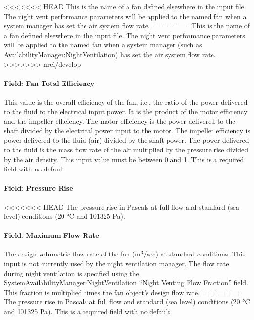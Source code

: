 <<<<<<< HEAD
This is the name of a fan defined elsewhere in the input file. The night vent performance parameters will be applied to the named fan when a system manager has set the air system flow rate.
=======
This is the name of a fan defined elsewhere in the input file. The night vent performance parameters will be applied to the named fan when a system manager (such as \hyperref[availabilitymanagernightventilation]{AvailabilityManager:NightVentilation}) has set the air system flow rate.
>>>>>>> nrel/develop

\paragraph{Field: Fan Total Efficiency}\label{field-fan-total-efficiency-4}

This value is the overall efficiency of the fan, i.e., the ratio of the power delivered to the fluid to the electrical input power. It is the product of the motor efficiency and the impeller efficiency. The motor efficiency is the power delivered to the shaft divided by the electrical power input to the motor. The impeller efficiency is power delivered to the fluid (air) divided by the shaft power. The power delivered to the fluid is the mass flow rate of the air multiplied by the pressure rise divided by the air density. This input value must be between 0 and 1. This is a required field with no default.

\paragraph{Field: Pressure Rise}\label{field-pressure-rise-4}

<<<<<<< HEAD
The pressure rise in Pascals at full flow and standard (sea level) conditions (20 °C and 101325 Pa).

\paragraph{Field: Maximum Flow Rate}\label{field-maximum-flow-rate-4}

The design volumetric flow rate of the fan (m\(^{3}\)/sec) at standard conditions. This input is not currently used by the night ventilation manager. The flow rate during night ventilation is specified using the System\hyperref[availabilitymanagernightventilation]{AvailabilityManager:NightVentilation} ``Night Venting Flow Fraction'' field. This fraction is multiplied times the fan object's design flow rate.
=======
The pressure rise in Pascals at full flow and standard (sea level) conditions (20 °C and 101325 Pa). This is a required field with no default.

